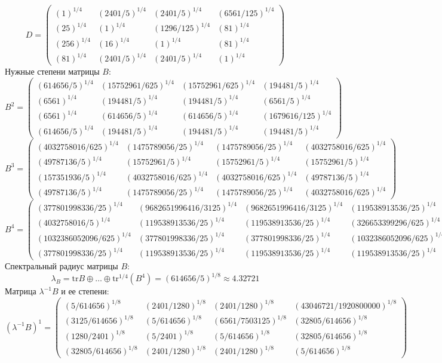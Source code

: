 $$D = \begin{pmatrix}
(1)^{1/4} & (2401/5)^{1/4} & (2401/5)^{1/4} & (6561/125)^{1/4}\\
(25)^{1/4} & (1)^{1/4} & (1296/125)^{1/4} & (81)^{1/4}\\
(256)^{1/4} & (16)^{1/4} & (1)^{1/4} & (81)^{1/4}\\
(81)^{1/4} & (2401/5)^{1/4} & (2401/5)^{1/4} & (1)^{1/4}
\end{pmatrix}
$$
Нужные степени матрицы $B$:
$$B^2 = \begin{pmatrix}
(614656/5)^{1/4} & (15752961/625)^{1/4} & (15752961/625)^{1/4} & (194481/5)^{1/4}\\
(6561)^{1/4} & (194481/5)^{1/4} & (194481/5)^{1/4} & (6561/5)^{1/4}\\
(6561)^{1/4} & (614656/5)^{1/4} & (614656/5)^{1/4} & (1679616/125)^{1/4}\\
(614656/5)^{1/4} & (194481/5)^{1/4} & (194481/5)^{1/4} & (194481/5)^{1/4}
\end{pmatrix}
$$
$$B^3 = \begin{pmatrix}
(4032758016/625)^{1/4} & (1475789056/25)^{1/4} & (1475789056/25)^{1/4} & (4032758016/625)^{1/4}\\
(49787136/5)^{1/4} & (15752961/5)^{1/4} & (15752961/5)^{1/4} & (15752961/5)^{1/4}\\
(157351936/5)^{1/4} & (4032758016/625)^{1/4} & (4032758016/625)^{1/4} & (49787136/5)^{1/4}\\
(49787136/5)^{1/4} & (1475789056/25)^{1/4} & (1475789056/25)^{1/4} & (4032758016/625)^{1/4}
\end{pmatrix}
$$
$$B^4 = \begin{pmatrix}
(377801998336/25)^{1/4} & (9682651996416/3125)^{1/4} & (9682651996416/3125)^{1/4} & (119538913536/25)^{1/4}\\
(4032758016/5)^{1/4} & (119538913536/25)^{1/4} & (119538913536/25)^{1/4} & (326653399296/625)^{1/4}\\
(1032386052096/625)^{1/4} & (377801998336/25)^{1/4} & (377801998336/25)^{1/4} & (1032386052096/625)^{1/4}\\
(377801998336/25)^{1/4} & (119538913536/25)^{1/4} & (119538913536/25)^{1/4} & (119538913536/25)^{1/4}
\end{pmatrix}
$$
Спектральный радиус матрицы $B$:
$$\lambda_{B} = \mathrm{tr}B\oplus \dots \oplus \mathrm{tr}^{1/4}(B^{4}) = (614656/5)^{1/8} \approx 4.32721$$
Матрица $\lambda^{-1}B$ и ее степени:
$$(\lambda^{-1}B)^1 = \begin{pmatrix}
(5/614656)^{1/8} & (2401/1280)^{1/8} & (2401/1280)^{1/8} & (43046721/1920800000)^{1/8}\\
(3125/614656)^{1/8} & (5/614656)^{1/8} & (6561/7503125)^{1/8} & (32805/614656)^{1/8}\\
(1280/2401)^{1/8} & (5/2401)^{1/8} & (5/614656)^{1/8} & (32805/614656)^{1/8}\\
(32805/614656)^{1/8} & (2401/1280)^{1/8} & (2401/1280)^{1/8} & (5/614656)^{1/8}
\end{pmatrix}
$$

